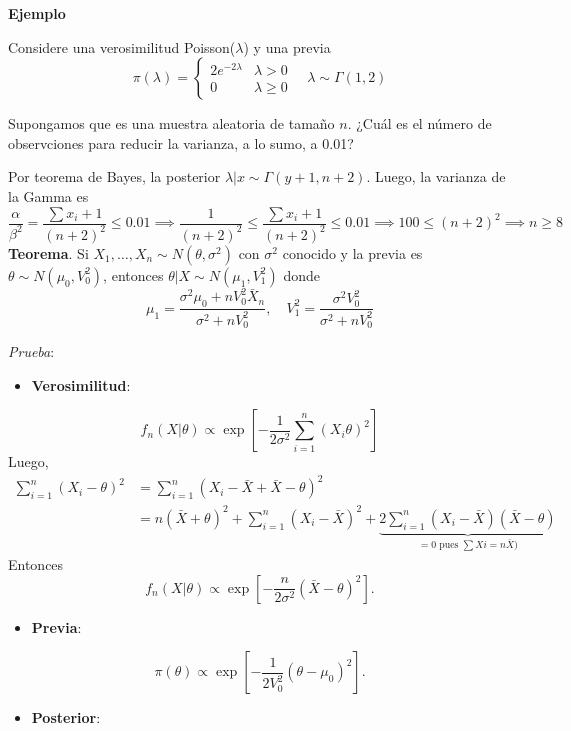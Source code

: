 \documentclass[
  12pt,
]{book}
\providecommand{\tightlist}{%
  \setlength{\itemsep}{0pt}\setlength{\parskip}{0pt}}
\begin{document}
\textbf{Ejemplo}

Considere una verosimilitud Poisson(\(\lambda\)) y una previa
\[ \pi(\lambda) = \begin{cases}2e^{-2\lambda} & \lambda> 0 \\ 0 & \lambda \geq 0\end{cases} \quad \lambda \sim \Gamma(1,2)\]

Supongamos que es una muestra aleatoria de tamaño \(n\). ¿Cuál es el número de observciones para reducir la varianza, a lo sumo, a 0.01?

Por teorema de Bayes, la posterior \(\lambda|x \sim \Gamma(y+1,n+2)\). Luego, la varianza de la Gamma es
\[\dfrac{\alpha}{\beta^2} = \dfrac{\sum x_i + 1}{(n+2)^2} \leq 0.01 \implies \dfrac{1}{(n+2)^2} \leq \dfrac{\sum x_i + 1}{(n+2)^2} \leq 0.01 \implies 100 \leq (n+2)^2 \implies n\geq 8\]
\textbf{Teorema}. Si \(X_1,\dots,X_n \sim N(\theta, \sigma^2)\) con \(\sigma^2\) conocido y la previa es \(\theta \sim N(\mu_0,V_0^2)\), entonces \(\theta|X\sim N(\mu_1,V_1^2)\) donde
\[ \mu_1 =  \dfrac{\sigma^2\mu_0 + nV_0^2 \bar X_n}{\sigma^2 + nV_0^2}, \quad V_1^2 = \dfrac{\sigma^2V_0^2}{\sigma^2 + nV_0^2}\]

\emph{Prueba}:

\begin{itemize}
\tightlist
\item
  \textbf{Verosimilitud}:
\end{itemize}

\[ f_n(X|\theta) \propto \exp\left[- \dfrac{1}{2\sigma^2} \sum_{i=1}^{n}(X_i\theta)^2\right]\]
Luego,
\begin{align*}
\sum_{i=1}^n (X_i-\theta)^2 & = \sum_{i=1}^n (X_i-\bar X + \bar X - \theta)^2 \\
& = n(\bar X + \theta)^2 + \sum_{i=1}^n (X_i-\bar X)^2 + \underbrace{2 \sum_{i=1}^n (X_i-\bar X)(\bar X - \theta)}_{= 0 \text{ pues } \sum Xi = n\bar X)}
\end{align*}
Entonces
\[ f_n(X|\theta) \propto \exp\left[-\dfrac{n}{2\sigma ^2}(\bar X - \theta )^2\right].\]

\begin{itemize}
\tightlist
\item
  \textbf{Previa}:
\end{itemize}

\[ \pi(\theta) \propto \exp\left[-\dfrac{1}{2V_0^2}(\theta - \mu_0)^2\right].\]

\begin{itemize}
\tightlist
\item
  \textbf{Posterior}:
\end{itemize}
\end{document}
